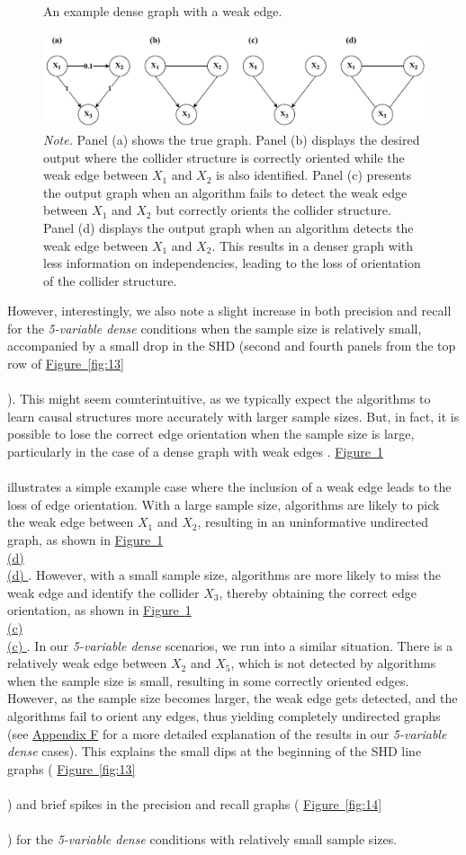 \documentclass[twoside, 11pt]{article}
\newcommand*{\figref}[2][]{%
  \hyperref[{fig:#2}]{%
    Figure~\ref*{fig:#2}%
    \ifx\\#1\\%
    \else
      #1%
    \fi
  }%
}
\begin{document}
\begin{figure}[!t]
    \centering
        \caption{An example dense graph with a weak edge.}
        \vspace{1mm}
        \includegraphics[width=1\textwidth]{figures/Fig17.pdf}
        \vspace{1mm}
        \caption*{\small{\textit{Note.} Panel (a) shows the true graph. Panel (b) displays the desired output where the collider structure is correctly oriented while the weak edge between $X_1$ and $X_2$ is also identified. Panel (c) presents the output graph when an algorithm fails to detect the weak edge between $X_1$ and $X_2$ but correctly orients the collider structure. Panel (d) displays the output graph when an algorithm detects the weak edge between $X_1$ and $X_2$. This results in a denser graph with less information on independencies, leading to the loss of orientation of the collider structure.}}
    \label{fig:19}
\end{figure}



However, interestingly, we also note a slight increase in both precision and recall for the \textit{5-variable dense} conditions when the sample size is relatively small, accompanied by a small drop in the SHD (second and fourth panels from the top row of \figref[]{13}). This might seem counterintuitive, as we typically expect the algorithms to learn causal structures more accurately with larger sample sizes. But, in fact, it is possible to lose the correct edge orientation when the sample size is large,  particularly in the case of a dense graph with weak edges \citep{eigenmann_structure_2017}. \figref[]{19} illustrates a simple example case where the inclusion of a weak edge leads to the loss of edge orientation. With a large sample size, algorithms are likely to pick the weak edge between $X_1$ and $X_2$, resulting in an uninformative undirected graph, as shown in \figref[(d)]{19}. However, with a small sample size, algorithms are more likely to miss the weak edge and identify the collider $X_3$, thereby obtaining the correct edge orientation, as shown in \figref[(c)]{19}. In our \textit{5-variable dense} scenarios, we run into a similar situation. There is a relatively weak edge between $X_2$ and $X_5$, which is not detected by algorithms when the sample size is small, resulting in some correctly oriented edges. However, as the sample size becomes larger, the weak edge gets detected, and the algorithms fail to orient any edges, thus yielding completely undirected graphs (see \hyperref[5pdenseexam]{Appendix F} for a more detailed explanation of the results in our \textit{5-variable dense} cases). This explains the small dips at the beginning of the SHD line graphs (\figref[]{13}) and brief spikes in the precision and recall graphs (\figref[]{14}) for the \textit{5-variable dense} conditions with relatively small sample sizes.
\end{document}
